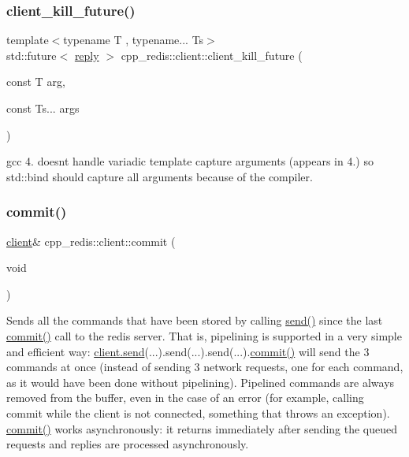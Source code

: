 \subsubsection{\texorpdfstring{client\+\_\+kill\+\_\+future()}{client\_kill\_future()}}
{\footnotesize\ttfamily template$<$typename T , typename... Ts$>$ \\
std\+::future$<$ \hyperlink{classcpp__redis_1_1reply}{reply} $>$ cpp\+\_\+redis\+::client\+::client\+\_\+kill\+\_\+future (\begin{DoxyParamCaption}\item[{const T}]{arg,  }\item[{const Ts...}]{args }\end{DoxyParamCaption})}

gcc 4. doesn\textquotesingle{}t handle variadic template capture arguments (appears in 4.) so std\+::bind should capture all arguments because of the compiler. \mbox{\label{classcpp__redis_1_1client_a36a48d61a4900e88fd67795ca59cbea3}} 
\subsubsection{\texorpdfstring{commit()}{commit()}}
{\footnotesize\ttfamily \hyperlink{classcpp__redis_1_1client}{client}\& cpp\+\_\+redis\+::client\+::commit (\begin{DoxyParamCaption}\item[{void}]{ }\end{DoxyParamCaption})}

Sends all the commands that have been stored by calling \hyperlink{classcpp__redis_1_1client_a490ef812b666e6d845fcacc808b87bc1}{send()} since the last \hyperlink{classcpp__redis_1_1client_a36a48d61a4900e88fd67795ca59cbea3}{commit()} call to the redis server. That is, pipelining is supported in a very simple and efficient way\+: \hyperlink{classcpp__redis_1_1client_a490ef812b666e6d845fcacc808b87bc1}{client.\+send}(...).send(...).send(...).\hyperlink{classcpp__redis_1_1client_a36a48d61a4900e88fd67795ca59cbea3}{commit()} will send the 3 commands at once (instead of sending 3 network requests, one for each command, as it would have been done without pipelining). Pipelined commands are always removed from the buffer, even in the case of an error (for example, calling commit while the client is not connected, something that throws an exception). \hyperlink{classcpp__redis_1_1client_a36a48d61a4900e88fd67795ca59cbea3}{commit()} works asynchronously\+: it returns immediately after sending the queued requests and replies are processed asynchronously.

